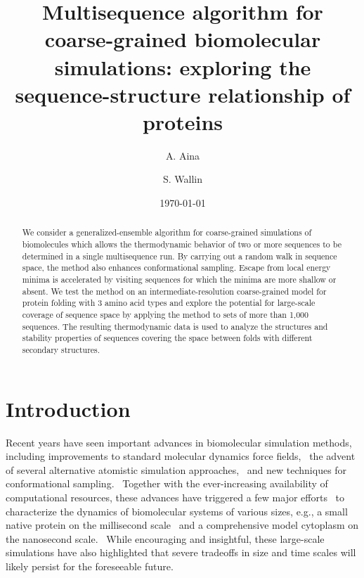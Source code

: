 \documentclass[
aip,
rsi,%
amsmath,amssymb,
reprint,%
]{revtex4-1}
\begin{document}

\title[Multisequence Monte Carlo simulations]{Multisequence algorithm for coarse-grained biomolecular simulations: exploring the sequence-structure relationship of proteins}

\author{A. Aina}
\author{S. Wallin}

\date{\today}

\begin{abstract}
We consider a generalized-ensemble algorithm for coarse-grained simulations of biomolecules which allows the thermodynamic behavior of two or more sequences to be determined in a single multisequence run. By carrying out a random walk in sequence space, the method also enhances conformational sampling. Escape from local energy minima is accelerated by visiting sequences for which the minima are more shallow or absent. We test the method on an intermediate-resolution coarse-grained model for protein folding with 3 amino acid types and explore the potential for large-scale coverage of sequence space by applying the method to sets of more than 1,000 sequences. The resulting thermodynamic data is used to analyze the structures and stability properties of sequences covering the space between folds with different secondary structures. 
\end{abstract}

                             

\maketitle

\section{Introduction}

Recent years have seen important advances in biomolecular simulation methods, including improvements to standard molecular dynamics force fields,~\cite{Piana2014} the advent of several alternative atomistic simulation approaches,~\cite{Ding2008,Irback2006,Verma2009,Yang2007} and new techniques for  conformational sampling.~\cite{Bernardi2015} Together with the ever-increasing availability of computational resources, these advances have triggered a few major efforts~\cite{McGuffee2010,Miao2010,Perilla2016,Lindorff-Larsen2011,Yu2016} to characterize the dynamics of biomolecular systems of various sizes, e.g., a small native protein on the millisecond scale~\cite{Lindorff-Larsen2011} and a comprehensive model cytoplasm on the nanosecond scale.~\cite{Yu2016} While encouraging and insightful, these large-scale simulations have also highlighted that severe tradeoffs in size and time scales will likely persist for the foreseeable future. 
\end{document}
